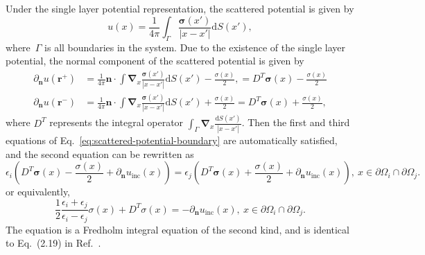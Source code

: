 \documentclass[prb,preprintnumbers,amsmath,amssymb, 10pt]{revtex4}
\newcommand{\M}[1]{\boldsymbol{#1}} %
\newcommand{\grad}{\M{\nabla}} %
\begin{document}
Under the single layer potential representation, the scattered potential is given by
\begin{equation}
    u(x) = \frac{1}{4 \pi} \int_{\Gamma} \frac{\mathbf{\sigma}(x')}{|x - x'|} \mathrm{d}S(x'),
\end{equation}
where~$\Gamma$ is all boundaries in the system.
Due to the existence of the single layer potential, the normal component of the scattered potential is given by
\begin{equation}\label{eq:scattered-potential}
    \begin{split}
    \partial_{\mathbf{n}} u(\mathbf{r^+}) &= \frac{1}{4 \pi} \mathbf{n} \cdot \int \grad_{x} \frac{\mathbf{\sigma}(x')}{|x - x'|} \mathrm{d}S(x') - \frac{\sigma(x)}{2}, = D^T \mathbf{\sigma}(x) - \frac{\sigma(x)}{2} \\
    \partial_{\mathbf{n}} u(\mathbf{r^-}) &= \frac{1}{4 \pi} \mathbf{n} \cdot \int \grad_{x} \frac{\mathbf{\sigma}(x')}{|x - x'|} \mathrm{d}S(x') + \frac{\sigma(x)}{2} = D^T \mathbf{\sigma}(x) + \frac{\sigma(x)}{2},
    \end{split}
\end{equation}
where $D^T$ represents the integral operator $\int_{\Gamma} \grad_{x} \frac{\mathrm{d}S(x')}{|x - x'|}$.
Then the first and third equations of Eq.~\eqref{eq:scattered-potential-boundary} are automatically satisfied, and the second equation can be rewritten as
\begin{equation}
    \epsilon_i \left( D^T \mathbf{\sigma}(x) - \frac{\sigma(x)}{2} + \partial_{\mathbf{n}} u_{\text{inc}}(x) \right) = \epsilon_j \left( D^T \mathbf{\sigma}(x) + \frac{\sigma(x)}{2} + \partial_{\mathbf{n}} u_{\text{inc}}(x) \right),~x \in \partial \Omega_i \cap \partial \Omega_j.
\end{equation}
or equivalently,
\begin{equation}\label{eq:sl_equation}
    \frac{1}{2} \frac{\epsilon_i + \epsilon_j}{\epsilon_i - \epsilon_j} \sigma(x) + D^T \sigma(x) = - \partial_{\mathbf{n}} u_{\text{inc}}(x),~x \in \partial \Omega_i \cap \partial \Omega_j.
\end{equation}
The equation is a Fredholm integral equation of the second kind, and is identical to Eq.~(2.19) in Ref.~\cite{greengard1994numerical}.

\end{document}
